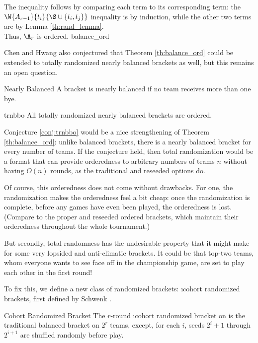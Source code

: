 {{        The inequality follows by comparing each term to its corresponding term: the $\W{A_{r-1}}{t_i}{\S \cup \{t_i, t_j\}}$ inequality is by induction, while the other two terms are by Lemma \ref{th:rand_lemma}.\\

        Thus, $\A_r$ is ordered.
    }{balance_ord}

    Chen and Hwang also conjectured that Theorem \ref{th:balance_ord} could be extended to totally randomized nearly balanced brackets as well, but this remains an open question.

    \begin{definition}{Nearly Balanced}{}
        A bracket is \i{nearly balanced} if no team receives more than one bye.
    \end{definition}

    \begin{conj}{}{trnbbo}
        All totally randomized nearly balanced brackets are ordered.
    \end{conj}

    Conjecture \ref{conj:trnbbo} would be a nice strengthening of Theorem \ref{th:balance_ord}: unlike balanced brackets, there is a nearly balanced bracket for every number of teams. If the conjecture held, then total randomization would be a format that can provide orderedness to arbitrary numbers of teams $n$ without having $O(n)$ rounds, as the traditional and reseeded options do.

    Of course, this orderedness does not come without drawbacks. For one, the randomization makes the orderedness feel a bit cheap: once the randomization is complete, before any games have even been played, the orderedness is lost. (Compare to the proper and reseeded ordered brackets, which maintain their orderedness throughout the whole tournament.)
    
    But secondly, total randomness has the undesirable property that it might make for some very lopsided and anti-climatic brackets. It could be that top-two teams, whom everyone wants to see face off in the championship game, are set to play each other in the first round!
    
    To fix this, we define a new class of randomized brackets: \i{cohort randomized brackets}, first defined by Schwenk \cite{randomized_cohort}.
    
    \begin{definition}{Cohort Randomized Bracket}{}
        The $r$-round \i{cohort randomized bracket} on is the traditional balanced bracket on $2^r$ teams, except, for each $i$, seeds $2^i + 1$ through $2^{i+1}$ are shuffled randomly before play.
    \end{definition}

}

